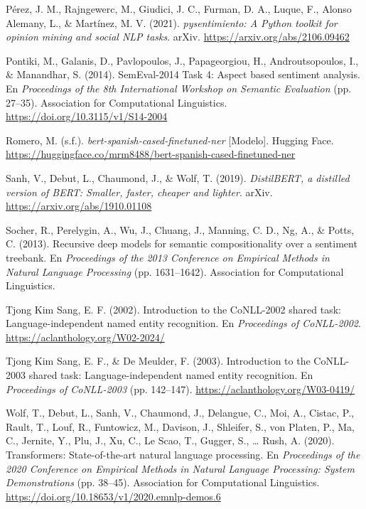 \documentclass[12pt,a4paper]{article}
\newenvironment{referencias}
  {\begin{list}{}{%
     \setlength{\leftmargin}{1.6em}\setlength{\itemindent}{-1.6em}%
     \setlength{\labelwidth}{0pt}\setlength{\labelsep}{0pt}%
     \setlength{\itemsep}{0.7em}\setlength{\parsep}{0pt}}}
  {\end{list}}
\begin{document}
\begin{referencias}
\item Pérez, J. M., Rajngewerc, M., Giudici, J. C., Furman, D. A., Luque, F., Alonso Alemany, L.,
\& Martínez, M. V. (2021). \emph{pysentimiento: A Python toolkit for opinion mining and social NLP
tasks}. arXiv. \url{https://arxiv.org/abs/2106.09462}

\item Pontiki, M., Galanis, D., Pavlopoulos, J., Papageorgiou, H., Androutsopoulos, I., \&
Manandhar, S. (2014). SemEval-2014 Task 4: Aspect based sentiment analysis. En \emph{Proceedings
of the 8th International Workshop on Semantic Evaluation} (pp. 27--35). Association for
Computational Linguistics. \url{https://doi.org/10.3115/v1/S14-2004}

\item Romero, M. (s.f.). \emph{bert-spanish-cased-finetuned-ner} [Modelo]. Hugging Face.
\url{https://huggingface.co/mrm8488/bert-spanish-cased-finetuned-ner}

\item Sanh, V., Debut, L., Chaumond, J., \& Wolf, T. (2019). \emph{DistilBERT, a distilled version
of BERT: Smaller, faster, cheaper and lighter}. arXiv. \url{https://arxiv.org/abs/1910.01108}

\item Socher, R., Perelygin, A., Wu, J., Chuang, J., Manning, C. D., Ng, A., \& Potts, C. (2013).
Recursive deep models for semantic compositionality over a sentiment treebank. En
\emph{Proceedings of the 2013 Conference on Empirical Methods in Natural Language Processing}
(pp. 1631--1642). Association for Computational Linguistics.

\item Tjong Kim Sang, E. F. (2002). Introduction to the CoNLL-2002 shared task:
Language-independent named entity recognition. En \emph{Proceedings of CoNLL-2002}.
\url{https://aclanthology.org/W02-2024/}

\item Tjong Kim Sang, E. F., \& De Meulder, F. (2003). Introduction to the CoNLL-2003 shared task:
Language-independent named entity recognition. En \emph{Proceedings of CoNLL-2003} (pp. 142--147).
\url{https://aclanthology.org/W03-0419/}

\item Wolf, T., Debut, L., Sanh, V., Chaumond, J., Delangue, C., Moi, A., Cistac, P., Rault, T.,
Louf, R., Funtowicz, M., Davison, J., Shleifer, S., von Platen, P., Ma, C., Jernite, Y., Plu, J.,
Xu, C., Le Scao, T., Gugger, S., \ldots{} Rush, A. (2020). Transformers: State-of-the-art natural
language processing. En \emph{Proceedings of the 2020 Conference on Empirical Methods in Natural
Language Processing: System Demonstrations} (pp. 38--45). Association for Computational
Linguistics. \url{https://doi.org/10.18653/v1/2020.emnlp-demos.6}

\end{referencias}
\end{document}
